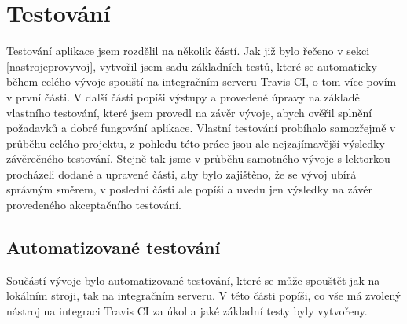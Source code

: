 \chapter{Testování}\label{testovani}
    Testování aplikace jsem rozdělil na několik částí. Jak již bylo řečeno v sekci \ref{nastrojeprovyvoj}, vytvořil jsem sadu základních testů, které se automaticky během celého vývoje spouští na integračním serveru Travis CI, o tom více povím v první části. V další části popíši výstupy a provedené úpravy na základě vlastního testování, které jsem provedl na závěr vývoje, abych ověřil splnění požadavků a dobré fungování aplikace. Vlastní testování probíhalo samozřejmě v průběhu celého projektu, z pohledu této práce jsou ale nejzajímavější výsledky závěrečného testování. Stejně tak jsme v průběhu samotného vývoje s lektorkou procházeli dodané a upravené části, aby bylo zajištěno, že se vývoj ubírá správným směrem, v poslední části ale popíši a uvedu jen výsledky na závěr provedeného akceptačního testování. 

    \section{Automatizované testování}\label{sec:automatizovaneTestovani}
    Součástí vývoje bylo automatizované testování, které se může spouštět jak na lokálním stroji, tak na integračním serveru. V této části popíši, co vše má zvolený nástroj na integraci Travis CI za úkol a jaké základní testy byly vytvořeny.
    
